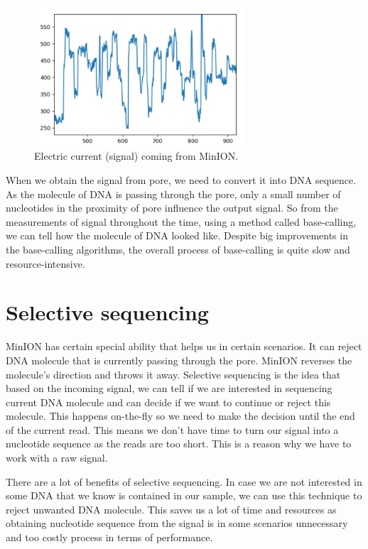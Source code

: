 \begin{figure}
\centerline{\includegraphics[width=0.7\textwidth, height=0.3\textheight]{images/signal}}
\caption[MinION signal]{Electric current (signal) coming from MinION.}
\label{obr:minIonCurrent}
\end{figure}

When we obtain the signal from pore, we need to convert it into DNA
sequence. As the molecule of DNA is passing through the pore, only a small
number of nucleotides in the proximity of pore influence the output signal. So from
the measurements of signal throughout the time, using a method called base-calling,
we can tell how the molecule of DNA looked like. Despite big improvements in the
base-calling algorithms, the overall process of base-calling is quite slow and
resource-intensive.

\section{Selective sequencing}

MinION has certain special ability that helps us in certain scenarios. It can reject
DNA molecule that is currently passing through the pore. MinION reverses the molecule’s direction and throws it away.
Selective sequencing is the idea that based on the incoming signal, we can tell
if we are interested in sequencing current DNA molecule and can decide if we want
to continue or reject this molecule. This happens on-the-fly so we need to make
the decision until the end of the current read. This means we don't have time to
turn our signal into a nucleotide sequence as the reads are too short. This is
a reason why we have to work with a raw signal.

There are a lot of benefits of selective sequencing. In case we are not interested
in some DNA that we know is contained in our sample, we can use this technique to
reject unwanted DNA molecule. This saves us a lot of time and resources as obtaining
nucleotide sequence from the signal is in some scenarios unnecessary and too
costly process in terms of performance.

